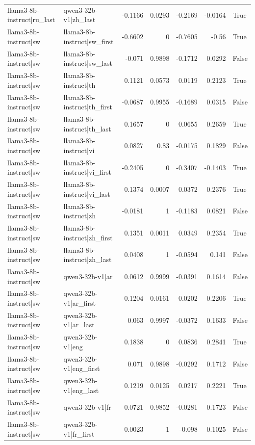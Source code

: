 \begin{table}
\begin{tabular}{l l r r r r l}
llama3-8b-instruct|ru_last & qwen3-32b-v1|zh_last & -0.1166 & 0.0293 & -0.2169 & -0.0164 & True \\
llama3-8b-instruct|sw & llama3-8b-instruct|sw_first & -0.6602 & 0 & -0.7605 & -0.56 & True \\
llama3-8b-instruct|sw & llama3-8b-instruct|sw_last & -0.071 & 0.9898 & -0.1712 & 0.0292 & False \\
llama3-8b-instruct|sw & llama3-8b-instruct|th & 0.1121 & 0.0573 & 0.0119 & 0.2123 & True \\
llama3-8b-instruct|sw & llama3-8b-instruct|th_first & -0.0687 & 0.9955 & -0.1689 & 0.0315 & False \\
llama3-8b-instruct|sw & llama3-8b-instruct|th_last & 0.1657 & 0 & 0.0655 & 0.2659 & True \\
llama3-8b-instruct|sw & llama3-8b-instruct|vi & 0.0827 & 0.83 & -0.0175 & 0.1829 & False \\
llama3-8b-instruct|sw & llama3-8b-instruct|vi_first & -0.2405 & 0 & -0.3407 & -0.1403 & True \\
llama3-8b-instruct|sw & llama3-8b-instruct|vi_last & 0.1374 & 0.0007 & 0.0372 & 0.2376 & True \\
llama3-8b-instruct|sw & llama3-8b-instruct|zh & -0.0181 & 1 & -0.1183 & 0.0821 & False \\
llama3-8b-instruct|sw & llama3-8b-instruct|zh_first & 0.1351 & 0.0011 & 0.0349 & 0.2354 & True \\
llama3-8b-instruct|sw & llama3-8b-instruct|zh_last & 0.0408 & 1 & -0.0594 & 0.141 & False \\
llama3-8b-instruct|sw & qwen3-32b-v1|ar & 0.0612 & 0.9999 & -0.0391 & 0.1614 & False \\
llama3-8b-instruct|sw & qwen3-32b-v1|ar_first & 0.1204 & 0.0161 & 0.0202 & 0.2206 & True \\
llama3-8b-instruct|sw & qwen3-32b-v1|ar_last & 0.063 & 0.9997 & -0.0372 & 0.1633 & False \\
llama3-8b-instruct|sw & qwen3-32b-v1|eng & 0.1838 & 0 & 0.0836 & 0.2841 & True \\
llama3-8b-instruct|sw & qwen3-32b-v1|eng_first & 0.071 & 0.9898 & -0.0292 & 0.1712 & False \\
llama3-8b-instruct|sw & qwen3-32b-v1|eng_last & 0.1219 & 0.0125 & 0.0217 & 0.2221 & True \\
llama3-8b-instruct|sw & qwen3-32b-v1|fr & 0.0721 & 0.9852 & -0.0281 & 0.1723 & False \\
llama3-8b-instruct|sw & qwen3-32b-v1|fr_first & 0.0023 & 1 & -0.098 & 0.1025 & False \\

\end{tabular}
\end{table}
